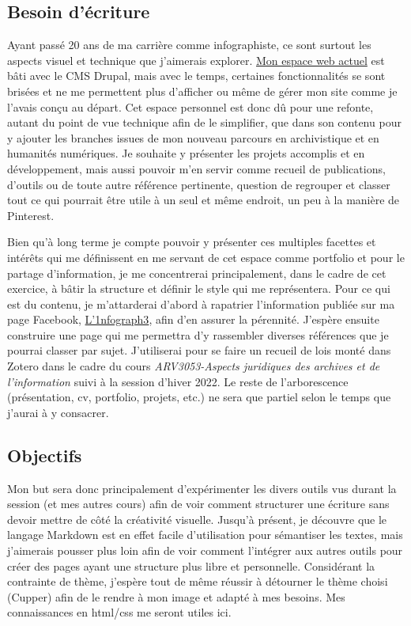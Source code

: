 \documentclass[12pt,french,letterpaper]{article}
\begin{document}
\normalsize{\hypertarget{besoin-duxe9criture}{%
\subsection{Besoin d'écriture}\label{besoin-duxe9criture}}

Ayant passé 20 ans de ma carrière comme infographiste, ce sont surtout
les aspects visuel et technique que j'aimerais explorer.
\href{http://amelielr.ca}{Mon espace web actuel} est bâti avec le CMS
Drupal, mais avec le temps, certaines fonctionnalités se sont brisées et
ne me permettent plus d'afficher ou même de gérer mon site comme je
l'avais conçu au départ. Cet espace personnel est donc dû pour une
refonte, autant du point de vue technique afin de le simplifier, que
dans son contenu pour y ajouter les branches issues de mon nouveau
parcours en archivistique et en humanités numériques. Je souhaite y
présenter les projets accomplis et en développement, mais aussi pouvoir
m'en servir comme recueil de publications, d'outils ou de toute autre
référence pertinente, question de regrouper et classer tout ce qui
pourrait être utile à un seul et même endroit, un peu à la manière de
Pinterest.

Bien qu'à long terme je compte pouvoir y présenter ces multiples
facettes et intérêts qui me définissent en me servant de cet espace
comme portfolio et pour le partage d'information, je me concentrerai
principalement, dans le cadre de cet exercice, à bâtir la structure et
définir le style qui me représentera. Pour ce qui est du contenu, je
m'attarderai d'abord à rapatrier l'information publiée sur ma page
Facebook, \href{http://facebook.com/1nfograph3}{L'1nfograph3}, afin d'en
assurer la pérennité. J'espère ensuite construire une page qui me
permettra d'y rassembler diverses références que je pourrai classer par
sujet. J'utiliserai pour se faire un recueil de lois monté dans Zotero
dans le cadre du cours \emph{ARV3053-Aspects juridiques des archives et
de l'information} suivi à la session d'hiver 2022. Le reste de
l'arborescence (présentation, cv, portfolio, projets, etc.) ne sera que
partiel selon le temps que j'aurai à y consacrer.

\hypertarget{objectifs}{%
\subsection{Objectifs}\label{objectifs}}

Mon but sera donc principalement d'expérimenter les divers outils vus
durant la session (et mes autres cours) afin de voir comment structurer
une écriture sans devoir mettre de côté la créativité visuelle. Jusqu'à
présent, je découvre que le langage Markdown est en effet facile
d'utilisation pour sémantiser les textes, mais j'aimerais pousser plus
loin afin de voir comment l'intégrer aux autres outils pour créer des
pages ayant une structure plus libre et personnelle. Considérant la
contrainte de thème, j'espère tout de même réussir à détourner le thème
choisi (Cupper) afin de le rendre à mon image et adapté à mes besoins.
Mes connaissances en html/css me seront utiles ici.

}
\end{document}
